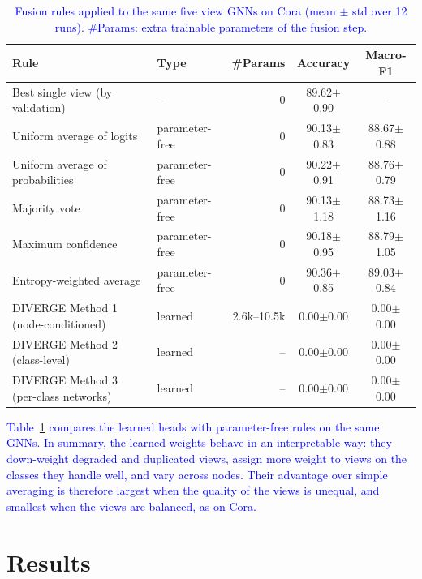 \documentclass{article}
\newcommand{\revtwo}[1]{\textcolor{blue}{#1}}  %
\begin{document}
\begin{table}[ht]
\centering
\caption{\revtwo{Fusion rules applied to the same five view GNNs on Cora (mean $\pm$ std over 12 runs). \#Params: extra trainable parameters of the fusion step.}}
\label{tab:ens_fusion_rules}
\begin{tabular}{l l r c c}
\hline
Rule & Type & \#Params & Accuracy & Macro-F1 \\
\hline
Best single view (by validation) & -- & 0 & 89.62{\scriptsize$\pm$0.90} & -- \\
Uniform average of logits & parameter-free & 0 & 90.13{\scriptsize$\pm$0.83} & 88.67{\scriptsize$\pm$0.88} \\
Uniform average of probabilities & parameter-free & 0 & 90.22{\scriptsize$\pm$0.91} & 88.76{\scriptsize$\pm$0.79} \\
Majority vote & parameter-free & 0 & 90.13{\scriptsize$\pm$1.18} & 88.73{\scriptsize$\pm$1.16} \\
Maximum confidence & parameter-free & 0 & 90.18{\scriptsize$\pm$0.95} & 88.79{\scriptsize$\pm$1.05} \\
Entropy-weighted average & parameter-free & 0 & 90.36{\scriptsize$\pm$0.85} & 89.03{\scriptsize$\pm$0.84} \\
\hline
DIVERGE Method 1 (node-conditioned) & learned & 2.6k--10.5k & 0.00{\scriptsize$\pm$0.00} & 0.00{\scriptsize$\pm$0.00} \\
DIVERGE Method 2 (class-level) & learned & -- & 0.00{\scriptsize$\pm$0.00} & 0.00{\scriptsize$\pm$0.00} \\
DIVERGE Method 3 (per-class networks) & learned & -- & 0.00{\scriptsize$\pm$0.00} & 0.00{\scriptsize$\pm$0.00} \\
\hline
\end{tabular}
\end{table}

\revtwo{Table~\ref{tab:ens_fusion_rules} compares the learned heads with parameter-free rules on the same GNNs. In summary, the learned weights behave in an interpretable way: they down-weight degraded and duplicated views, assign more weight to views on the classes they handle well, and vary across nodes. Their advantage over simple averaging is therefore largest when the quality of the views is unequal, and smallest when the views are balanced, as on Cora.}


\section{Results}



\end{document}

